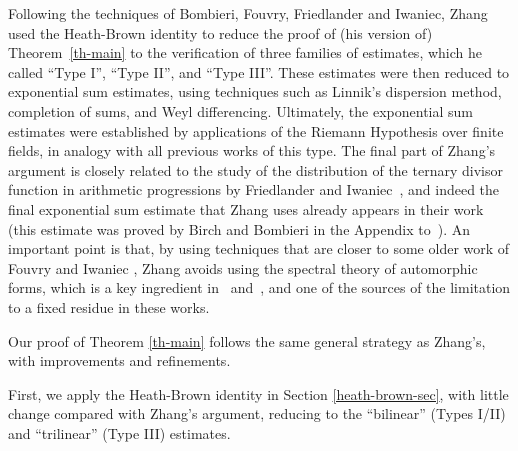 \documentclass[12pt,a4paper,reqno]{amsart}
\numberwithin{equation}{section}
\theoremstyle{plain}
\theoremstyle{definition}
\begin{document}
\par
Following the techniques of Bombieri, Fouvry, Friedlander and Iwaniec,
Zhang used the Heath-Brown identity \cite{hb-ident} to reduce the
proof of (his version of) Theorem~\ref{th-main} to the verification of
three families of estimates, which he called ``Type I'', ``Type II'',
and ``Type III''.  These estimates were then reduced to exponential
sum estimates, using techniques such as Linnik's dispersion method,
completion of sums, and Weyl differencing. Ultimately, the exponential
sum estimates were established by applications of the Riemann
Hypothesis over finite fields, in analogy with all previous works of
this type.  The final part of Zhang's argument is closely related to
the study of the distribution of the ternary divisor function in
arithmetic progressions by Friedlander and Iwaniec~\cite{fi-3}, and
indeed the final exponential sum estimate that Zhang uses already
appears in their work (this estimate was proved by Birch and Bombieri
in the Appendix to~\cite{fi-3}).  An important point is that, by using
techniques that are closer to some older work of Fouvry and Iwaniec
\cite{fi}, Zhang avoids using the spectral theory of automorphic
forms, which is a key ingredient in~\cite{fi-2} and~\cite{bfi}, and
one of the sources of the limitation to a fixed residue in these
works.

Our proof of Theorem \ref{th-main} follows the same general strategy
as Zhang's, with improvements and refinements.
\par
First, we apply the Heath-Brown identity \cite{hb-ident} in Section
\ref{heath-brown-sec}, with little change compared with Zhang's
argument, reducing to the ``bilinear'' (Types I/II) and ``trilinear''
(Type III) estimates. 
\end{document}
